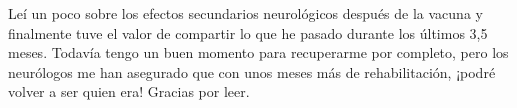 {Leí un poco sobre los efectos secundarios neurológicos después de la vacuna y
finalmente tuve el valor de compartir lo que he pasado durante los últimos 3,5
meses. Todavía tengo un buen momento para recuperarme por completo, pero los
neurólogos me han asegurado que con unos meses más de rehabilitación, ¡podré
volver a ser quien era! Gracias por leer.

}
